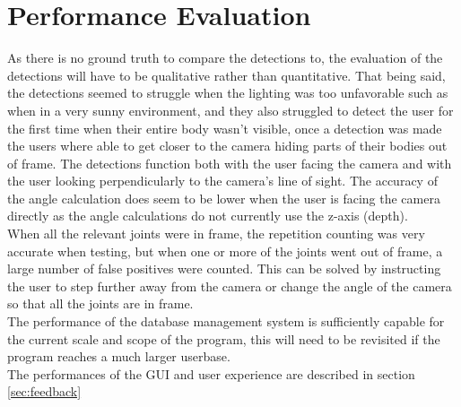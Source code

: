 


\section{Performance Evaluation}
    As there is no ground truth to compare the detections to, the evaluation of the detections will have to be qualitative rather than quantitative. That being said, the detections seemed to struggle when the lighting was too unfavorable such as when in a very sunny environment, and they also struggled to detect the user for the first time when their entire body wasn't visible, once a detection was made the users where able to get closer to the camera hiding parts of their bodies out of frame. The detections function both with the user facing the camera and with the user looking perpendicularly to the camera's line of sight. The accuracy of the angle calculation does seem to be lower when the user is facing the camera directly as the angle calculations do not currently use the z-axis (depth).\\
    When all the relevant joints were in frame, the repetition counting was very accurate when testing, but when one or more of the joints went out of frame, a large number of false positives were counted. This can be solved by instructing the user to step further away from the camera or change the angle of the camera so that all the joints are in frame.\\
    The performance of the database management system is sufficiently capable for the current scale and scope of the program, this will need to be revisited if the program reaches a much larger userbase.\\
    The performances of the GUI and user experience are described in section \ref{sec:feedback}
    
